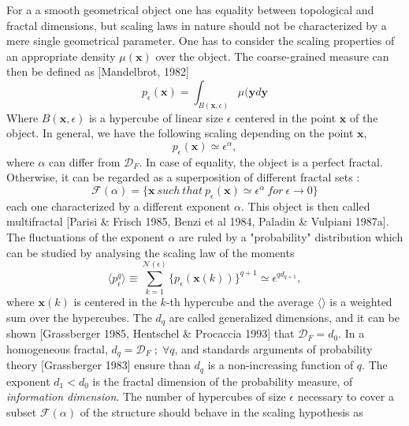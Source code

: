 For a a smooth geometrical object one has equality between topological and fractal dimensions, but scaling laws in nature should not be characterized by a mere single geometrical parameter. One has to consider the scaling properties of an appropriate density $\mu(\mathbf{x})$ over the object. The coarse-grained measure can then be defined as [Mandelbrot, 1982]
\begin{equation}
    p_\epsilon(\mathbf{x})=\int_{B(\mathbf{x},\epsilon)}\mu(\mathbf{y}d\mathbf{y}
\end{equation}
Where $B(\mathbf{x},\epsilon)$ is a hypercube of linear size $\epsilon$ centered in the point $\mathbf{x}$ of the object. In general, we have the following scaling depending on the point $\mathbf{x}$, 
\begin{equation}
    p_\epsilon(\mathbf{x})\simeq\epsilon^\alpha,
\end{equation}
where $\alpha$ can differ from $\mathcal{D}_F$. In case of equality, the object is a perfect fractal. Otherwise, it can be regarded as a superposition of different fractal sets :
\begin{equation}
    \mathcal{F}(\alpha)=\{\mathbf{x}~such~that~p_\epsilon(\mathbf{x})\simeq\epsilon^\alpha~for~\epsilon\rightarrow0\}
\end{equation}
each one characterized by a different exponent $\alpha$. This object is then called multifractal [Parisi \& Frisch 1985, Benzi et al 1984, Paladin \& Vulpiani 1987a]. The fluctuations of the exponent $\alpha$ are ruled by a "probability" distribution which can be studied by analysing the scaling law of the moments
\begin{equation}
    \langle p_\epsilon^q\rangle\equiv\sum_{k=1}^{\mathcal{N}(\epsilon)}\bigg\{p_\epsilon(\mathbf{x}(k))\bigg\}^{q+1}\simeq\epsilon^{qd_{q+1}},
\end{equation}
where $\mathbf{x}(k)$ is centered in the $k$-th hypercube and the average $\langle\rangle$ is a weighted sum over the hypercubes. 
The $d_q$ are called generalized dimensions, and it can be shown [Grassberger 1985, Hentschel \& Procaccia 1993] that $\mathcal{D}_F=d_0$. In a homogeneous fractal, $d_q=\mathcal{D}_F\;  ;\;\forall q$, and standards arguments of probability theory [Grassberger 1983] ensure than $d_q$ is a non-increasing function of $q$. The exponent $d_1<d_0$ is the fractal dimension of the probability measure, of \emph{information dimension}. The number of hypercubes of size $\epsilon$ necessary to cover a subset $\mathcal{F}(\alpha)$ of the structure should behave in the scaling hypothesis as
